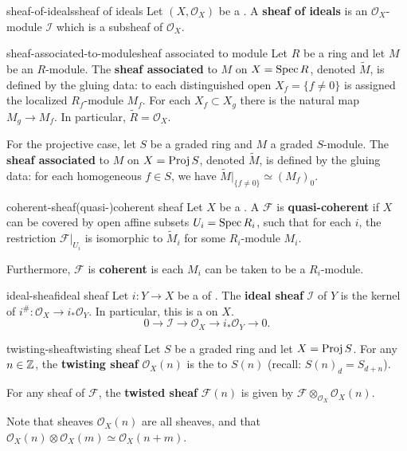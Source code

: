 \begin{topic}{sheaf-of-ideals}{sheaf of ideals}
    Let $(X, \mathcal{O}_X)$ be a . A \textbf{sheaf of ideals} is an $\mathcal{O}_X$-module $\mathcal{I}$ which is a subsheaf of $\mathcal{O}_X$.
\end{topic}

\begin{topic}{sheaf-associated-to-module}{sheaf associated to module}
    Let $R$ be a ring and let $M$ be an $R$-module. The \textbf{sheaf associated} to $M$ on $X = \operatorname{Spec} R$, denoted $\tilde{M}$, is defined by the gluing data: to each distinguished open $X_f = \{ f \ne 0 \}$ is assigned the localized $R_f$-module $M_f$. For each $X_f \subset X_g$ there is the natural map $M_g \to M_f$. In particular, $\tilde{R} = \mathcal{O}_X$.
    
    For the projective case, let $S$ be a graded ring and $M$ a graded $S$-module. The \textbf{sheaf associated} to $M$ on $X = \operatorname{Proj} S$, denoted $\tilde{M}$, is defined by the gluing data: for each homogeneous $f \in S$, we have $\tilde{M}|_{\{ f \ne 0\}} \simeq (M_f)_0$.
\end{topic}

\begin{topic}{coherent-sheaf}{(quasi-)coherent sheaf}
    Let $X$ be a . A  $\mathcal{F}$ is \textbf{quasi-coherent} if $X$ can be covered by open affine subsets $U_i = \operatorname{Spec} R_i$, such that for each $i$, the restriction $\mathcal{F}|_{U_i}$ is isomorphic to $\tilde{M}_i$ for some $R_i$-module $M_i$.
    
    Furthermore, $\mathcal{F}$ is \textbf{coherent} is each $M_i$ can be taken to be a  $R_i$-module.
\end{topic}

\begin{topic}{ideal-sheaf}{ideal sheaf}
    Let $i : Y \to X$ be a  of . The \textbf{ideal sheaf} $\mathcal{I}$ of $Y$ is the kernel of $i^\# : \mathcal{O}_X \to i_* \mathcal{O}_Y$. In particular, this is a  on $X$.
    \[ 0 \to \mathcal{I} \to \mathcal{O}_X \to i_* \mathcal{O}_Y \to 0 . \]
\end{topic}

\begin{topic}{twisting-sheaf}{twisting sheaf}
    Let $S$ be a graded ring and let $X = \operatorname{Proj} S$. For any $n \in \mathbb{Z}$, the \textbf{twisting sheaf} $\mathcal{O}_X(n)$ is the  to $S(n)$ (recall: $S(n)_d = S_{d + n}$).
    
    For any sheaf of  $\mathcal{F}$, the \textbf{twisted sheaf} $\mathcal{F}(n)$ is given by $\mathcal{F} \otimes_{\mathcal{O}_X} \mathcal{O}_X(n)$.
    
    Note that sheaves $\mathcal{O}_X(n)$ are all  sheaves, and that $\mathcal{O}_X(n) \otimes \mathcal{O}_X(m) \simeq \mathcal{O}_X(n + m)$.
\end{topic}

